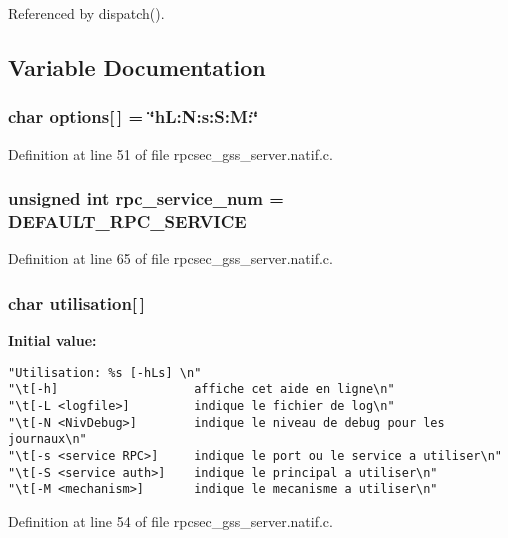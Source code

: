 Referenced by dispatch().

\subsection{Variable Documentation}
\subsubsection{\setlength{\rightskip}{0pt plus 5cm}char {\bf options}[$\,$] = \char`\"{}h\-L:N:s:S:M:\char`\"{}}\label{rpcsec__gss__server_8natif_8c_a12}




Definition at line 51 of file rpcsec\_\-gss\_\-server.natif.c.
\subsubsection{\setlength{\rightskip}{0pt plus 5cm}unsigned int {\bf rpc\_\-service\_\-num} = DEFAULT\_\-RPC\_\-SERVICE}\label{rpcsec__gss__server_8natif_8c_a15}




Definition at line 65 of file rpcsec\_\-gss\_\-server.natif.c.
\subsubsection{\setlength{\rightskip}{0pt plus 5cm}char {\bf utilisation}[$\,$]}\label{rpcsec__gss__server_8natif_8c_a13}


{\bf Initial value:}

\footnotesize\begin{verbatim} 
"Utilisation: %s [-hLs] \n"
"\t[-h]                   affiche cet aide en ligne\n"
"\t[-L <logfile>]         indique le fichier de log\n"
"\t[-N <NivDebug>]        indique le niveau de debug pour les journaux\n" 
"\t[-s <service RPC>]     indique le port ou le service a utiliser\n" 
"\t[-S <service auth>]    indique le principal a utiliser\n"
"\t[-M <mechanism>]       indique le mecanisme a utiliser\n"
\end{verbatim}\normalsize 


Definition at line 54 of file rpcsec\_\-gss\_\-server.natif.c.